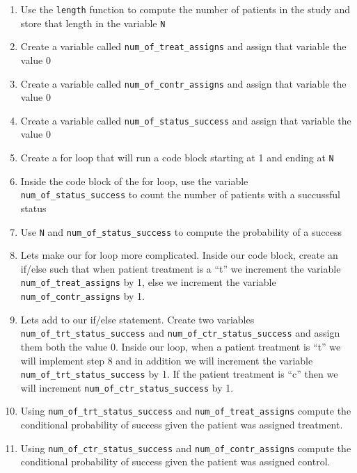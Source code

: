 \begin{enumerate}
\def\labelenumi{\arabic{enumi}.}
\tightlist
\item
  Use the \texttt{length} function to compute the number of patients in
  the study and store that length in the variable \texttt{N}
\item
  Create a variable called \texttt{num\_of\_treat\_assigns} and assign
  that variable the value 0
\item
  Create a variable called \texttt{num\_of\_contr\_assigns} and assign
  that variable the value 0
\item
  Create a variable called \texttt{num\_of\_status\_success} and assign
  that variable the value 0
\item
  Create a for loop that will run a code block starting at 1 and ending
  at \texttt{N}
\item
  Inside the code block of the for loop, use the variable
  \texttt{num\_of\_status\_success} to count the number of patients with
  a succussful status
\item
  Use \texttt{N} and \texttt{num\_of\_status\_success} to compute the
  probability of a success
\item
  Lets make our for loop more complicated. Inside our code block, create
  an if/else such that when patient treatment is a ``t'' we increment
  the variable \texttt{num\_of\_treat\_assigns} by 1, else we increment
  the variable \texttt{num\_of\_contr\_assigns} by 1.
\item
  Lets add to our if/else statement. Create two variables
  \texttt{num\_of\_trt\_status\_success} and
  \texttt{num\_of\_ctr\_status\_success} and assign them both the value
  0. Inside our loop, when a patient treatment is ``t'' we will
  implement step 8 and in addition we will increment the variable
  \texttt{num\_of\_trt\_status\_success} by 1. If the patient treatment
  is ``c'' then we will increment \texttt{num\_of\_ctr\_status\_success}
  by 1.
\item
  Using \texttt{num\_of\_trt\_status\_success} and
  \texttt{num\_of\_treat\_assigns} compute the conditional probability
  of success given the patient was assigned treatment.
\item
  Using \texttt{num\_of\_ctr\_status\_success} and
  \texttt{num\_of\_contr\_assigns} compute the conditional probability
  of success given the patient was assigned control.
\end{enumerate}


    
    
    
